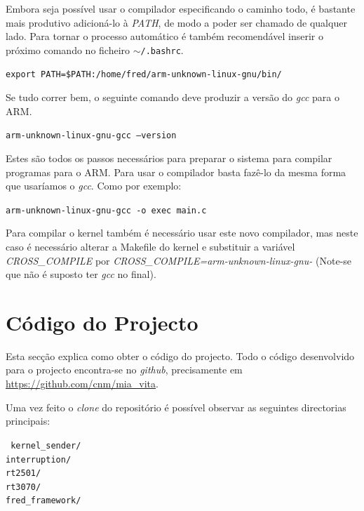 \documentclass[10pt,a4paper,oneside]{book}
\begin{document}
Embora seja possível usar o compilador especificando o caminho todo, é bastante mais produtivo adicioná-lo à \emph{PATH}, de modo a poder ser chamado de qualquer lado. Para tornar o processo automático é também recomendável inserir o próximo comando no ficheiro {\tt $\sim$/.bashrc}.

\begin{center}
{\tt export PATH=\$PATH:/home/fred/arm-unknown-linux-gnu/bin/}
\end{center}

Se tudo correr bem, o seguinte comando deve produzir a versão do \emph{gcc} para o ARM.

\begin{center}
{\tt arm-unknown-linux-gnu-gcc --version}
\end{center}

Estes são todos os passos necessários para preparar o sistema para compilar programas para o ARM. Para usar o compilador basta fazê-lo da mesma forma que usaríamos o \emph{gcc}. Como por exemplo:

\begin{center}
{\tt arm-unknown-linux-gnu-gcc -o exec main.c}
\end{center}

Para compilar o kernel também é necessário usar este novo compilador, mas neste caso é necessário alterar a Makefile do kernel e substituir a variável \emph{CROSS\_COMPILE} por \emph{CROSS\_COMPILE=arm-unknown-linux-gnu-} (Note-se que não é suposto ter \emph{gcc} no final).

\section{Código do Projecto}

Esta secção explica como obter o código do projecto. Todo o código desenvolvido para o projecto encontra-se no \emph{github}, precisamente em \href{https://github.com/cnm/mia\_vita}{https://github.com/cnm/mia\_vita}. 

Uma vez feito o \emph{clone} do repositório é possível observar as seguintes directorias principais:

\begin{flushleft}
  {\tt
    kernel\_sender/\\
    interruption/\\
    rt2501/\\
    rt3070/\\
    fred\_framework/
  }
\end{flushleft}
\end{document}
